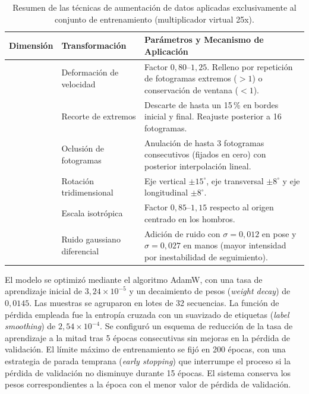 \begin{table}[H]
    \centering
    \small
    \caption{Resumen de las técnicas de aumentación de datos aplicadas exclusivamente al conjunto de entrenamiento (multiplicador virtual 25x).}
    \label{tab:data_augmentation}
    \begin{tabularx}{\textwidth}{>{\raggedright\arraybackslash}p{} >{\raggedright\arraybackslash}p{} >{\raggedright\arraybackslash}X}
        \toprule
        \textbf{Dimensión} & \textbf{Transformación} & \textbf{Parámetros y Mecanismo de Aplicación} \\
        \midrule
        \multirow{3}{*}{\textbf{Temporal}} 
            & Deformación de velocidad & Factor $0{,}80$--$1{,}25$. Relleno por repetición de fotogramas extremos ($>1$) o conservación de ventana ($<1$). \\
            \addlinespace[3pt]
            & Recorte de extremos & Descarte de hasta un 15\,\% en bordes inicial y final. Reajuste posterior a 16 fotogramas. \\
            \addlinespace[3pt]
            & Oclusión de fotogramas & Anulación de hasta 3 fotogramas consecutivos (fijados en cero) con posterior interpolación lineal. \\
        \midrule
        \multirow{3}{*}{\textbf{Espacial}} 
            & Rotación tridimensional & Eje vertical $\pm 15^{\circ}$, eje transversal $\pm 8^{\circ}$ y eje longitudinal $\pm 8^{\circ}$. \\
            \addlinespace[3pt]
            & Escala isotrópica & Factor $0{,}85$--$1{,}15$ respecto al origen centrado en los hombros. \\
            \addlinespace[3pt]
            & Ruido gaussiano diferencial & Adición de ruido con $\sigma = 0{,}012$ en pose y $\sigma = 0{,}027$ en manos (mayor intensidad por inestabilidad de seguimiento). \\
        \bottomrule
    \end{tabularx}
\end{table}

El modelo se optimizó mediante el algoritmo AdamW, con una tasa de aprendizaje inicial de $3{,}24 \times 10^{-5}$ y un decaimiento de pesos (\textit{weight decay}) de $0{,}0145$. Las muestras se agruparon en lotes de 32 secuencias. La función de pérdida empleada fue la entropía cruzada con un suavizado de etiquetas (\textit{label smoothing}) de $2{,}54 \times 10^{-4}$. Se configuró un esquema de reducción de la tasa de aprendizaje a la mitad tras 5 épocas consecutivas sin mejoras en la pérdida de validación. El límite máximo de entrenamiento se fijó en 200 épocas, con una estrategia de parada temprana (\textit{early stopping}) que interrumpe el proceso si la pérdida de validación no disminuye durante 15 épocas. El sistema conserva los pesos correspondientes a la época con el menor valor de pérdida de validación.

